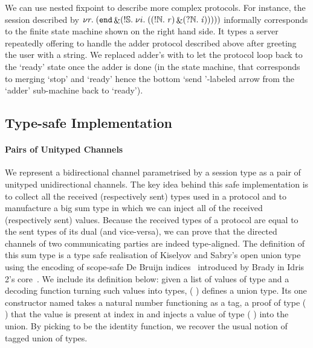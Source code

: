 \documentclass{easychair}
\begin{document}
We can use nested fixpoint to describe more complex
protocols. For instance, the session described by
$
\nu r.\;(\mathtt{end} \mathop{\&} (!\mathbb{S}.\;\nu i.\;((!\mathbb{N}.\;\mathit{r}) \mathop{\&} (?\mathbb{N}.\;\mathit{i}))
  )))
$
informally corresponds to the finite state machine
shown on the right hand side.
%
It types a server repeatedly offering to handle the adder
protocol described above after greeting the user with a string.
We replaced adder's \stopsesh{} with  to let the protocol
loop back to the `ready' state once the adder is done
(in the state machine, that corresponds to merging `stop'
and `ready' hence the bottom `send \nat'-labeled arrow from the
`adder' sub-machine back to `ready').


\subsection*{Type-safe Implementation}

\paragraph{Pairs of Unityped Channels}
We represent a bidirectional channel parametrised by a session
type as a pair of unityped unidirectional channels.
%
The key idea behind this safe implementation is to collect
all the received (respectively sent) types used in a protocol
and to manufacture a big sum type in which we can inject all
of the received (respectively sent) values.
%
Because the received types of a protocol are equal to the sent
types of its dual (and vice-versa), we can prove that the directed
channels of two communicating parties are indeed type-aligned.
%
The definition of this sum type is a type safe realisation of
Kiselyov and Sabry's open union type~\cite{DBLP:conf/haskell/KiselyovSS13}
using the encoding of scope-safe
De Bruijn indices~\cite{MANUAL:journals/math/debruijn72}
introduced by Brady in Idris 2's core~\cite{DBLP:conf/ecoop/Brady21}.
%
We include its definition below: given
a list  of values of type 
and a decoding function  turning such values into types,
(  )
defines a union type.
Its one constructor named  takes a natural
number  functioning as a tag,
a proof of type
(   )
that the value  is present at index 
in  and injects a value of type ( )
into the union.
%
By picking  to be the identity function, we recover the
usual notion of tagged union of types.
\end{document}
